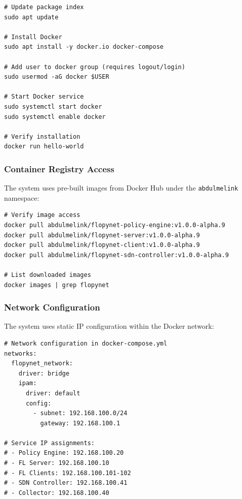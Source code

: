 \begin{lstlisting}[style=bashcode, caption=Docker Installation (Ubuntu)]
# Update package index
sudo apt update

# Install Docker
sudo apt install -y docker.io docker-compose

# Add user to docker group (requires logout/login)
sudo usermod -aG docker $USER

# Start Docker service
sudo systemctl start docker
sudo systemctl enable docker

# Verify installation
docker run hello-world
\end{lstlisting}

\subsubsection{Container Registry Access}

The system uses pre-built images from Docker Hub under the \texttt{abdulmelink} namespace:

\begin{lstlisting}[style=bashcode, caption=Container Image Verification]
# Verify image access
docker pull abdulmelink/flopynet-policy-engine:v1.0.0-alpha.9
docker pull abdulmelink/flopynet-server:v1.0.0-alpha.9
docker pull abdulmelink/flopynet-client:v1.0.0-alpha.9
docker pull abdulmelink/flopynet-sdn-controller:v1.0.0-alpha.9

# List downloaded images
docker images | grep flopynet
\end{lstlisting}

\subsubsection{Network Configuration}

The system uses static IP configuration within the Docker network:

\begin{lstlisting}[style=dockercode, caption=Network Configuration]
# Network configuration in docker-compose.yml
networks:
  flopynet_network:
    driver: bridge
    ipam:
      driver: default
      config:
        - subnet: 192.168.100.0/24
          gateway: 192.168.100.1

# Service IP assignments:
# - Policy Engine: 192.168.100.20
# - FL Server: 192.168.100.10
# - FL Clients: 192.168.100.101-102
# - SDN Controller: 192.168.100.41
# - Collector: 192.168.100.40
\end{lstlisting}

